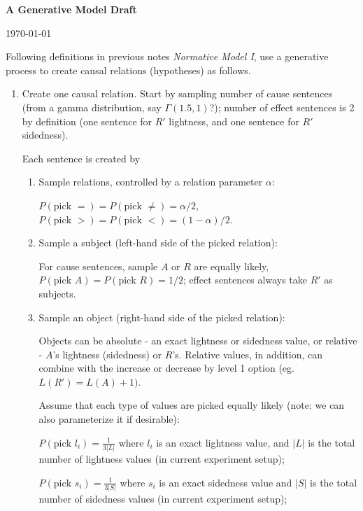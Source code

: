 \documentclass[11pt]{article}
\begin{document}

\begin{center}
{\bf A Generative Model Draft}

{\normalsize \today}
\end{center}



Following definitions in previous notes \textit{Normative Model I},
use a generative process to create causal relations (hypotheses) as follows.

\begin{enumerate}
\item Create one causal relation.
Start by sampling number of cause sentences (from a gamma distribution, say $\Gamma(1.5, 1)$?);
number of effect sentences is 2 by definition 
(one sentence for $R'$ lightness, and one sentence for $R'$ sidedness).

Each sentence is created by

\begin{enumerate}
	\item Sample relations, controlled by a relation parameter $\alpha$:

	$P(\text{pick }=) = P(\text{pick }\neq) = \alpha/2$, 
	$P(\text{pick }>) = P(\text{pick }<) = (1-\alpha)/2$.

	\item Sample a subject (left-hand side of the picked relation):

	For cause sentences, sample $A$ or $R$ are equally likely, 
	$P(\text{pick }A) = P(\text{pick }R) = 1/2$;
	effect sentences always take $R'$ as subjects.

	\item Sample an object (right-hand side of the picked relation):

	Objects can be absolute - an exact lightness or sidedness value,
	or relative - $A$'s lightness (sidedness) or $R$'s.
	Relative values, in addition, can combine with the increase or decrease by level 1 option (eg. $L(R')=L(A)+1)$.

	Assume that each type of values are picked equally likely (note: we can also parameterize it if desirable):

	$P(\text{pick }l_i) = \frac{1}{3|L|}$ 
	where $l_i$ is an exact lightness value, 
	and $|L|$ is the total number of lightness values (in current experiment setup);

	$P(\text{pick }s_i) = \frac{1}{3|S|}$
	where $s_i$ is an exact sidedness value
	and $|S|$ is the total number of sidedness values (in current experiment setup);


\end{enumerate}
\end{enumerate}
\end{document}
